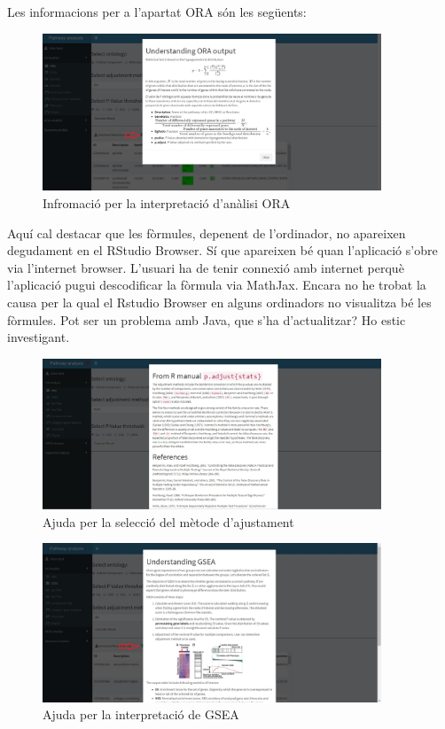 Les informacions per a l'apartat \gls{ORA} són les següents:

\begin{figure}[H]
\centering
\includegraphics[width=0.9\textwidth]{figures/Help_ORA_output.jpg} 
\caption{Infromació per la interpretació d'anàlisi \gls{ORA}}
\end{figure}
Aquí cal destacar que les fòrmules, depenent de l'ordinador, no apareixen degudament en el RStudio Browser. Sí que apareixen bé quan l'aplicació s'obre via l’internet browser. L'usuari ha de tenir connexió amb internet perquè l'aplicació pugui descodificar la fòrmula via MathJax. Encara no he trobat la causa per la qual el Rstudio Browser en alguns ordinadors no visualitza bé les fòrmules. Pot ser un problema amb Java, que s'ha d'actualitzar? Ho estic investigant.

\begin{figure}[H]
\centering
\includegraphics[width=0.9\textwidth]{figures/Help_pAdjustMethod.jpg} 
\caption{Ajuda per la selecció del mètode d'ajustament}
\end{figure}


\begin{figure}[H]
\centering
\includegraphics[width=0.9\textwidth]{figures/Help_GSEA_output.jpg} 
\caption{Ajuda per la interpretació de \gls{GSEA}}
\end{figure}


